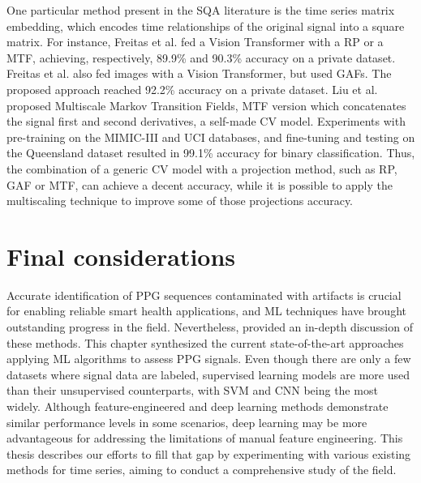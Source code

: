 

One particular method present in the \gls{SQA} literature is the time series matrix embedding, which encodes time relationships of the original signal into a square matrix. For instance, Freitas et al. \cite{imaging-4} fed a Vision Transformer with a \gls{RP} or a \gls{MTF}, achieving, respectively, 89.9\% and 90.3\% accuracy on a private dataset. Freitas et al. \cite{imaging-5} also fed images with a Vision Transformer, but used \glspl{GAF}. The proposed approach reached 92.2\% accuracy on a private dataset. Liu et al. \cite{imaging-6} proposed  Multiscale Markov Transition Fields, \gls{MTF} version which concatenates the signal first and second derivatives,  a self-made \gls{CV} model. Experiments with pre-training on the MIMIC-III and UCI databases, and fine-tuning and testing on the Queensland dataset resulted in 99.1\% accuracy for binary classification. Thus, the combination of a generic \gls{CV} model with a projection method, such as \gls{RP}, \gls{GAF} or \gls{MTF}, can achieve a decent accuracy, while it is possible to apply the multiscaling technique to improve some of those projections accuracy. 


\section{Final considerations}
\label{sec:considerations}

Accurate identification of \gls{PPG} sequences contaminated with artifacts is crucial for enabling reliable smart health applications, and \gls{ML} techniques have brought outstanding progress in the field. Nevertheless,  provided an in-depth discussion of these methods. This chapter synthesized the current state-of-the-art approaches applying \gls{ML} algorithms to assess \gls{PPG} signals. Even though there are only a few datasets where signal data are labeled, supervised learning models are more used than their unsupervised counterparts, with \gls{SVM} and \gls{CNN} being the most
widely. Although feature-engineered and deep learning methods demonstrate similar performance levels in some scenarios, deep learning may be more advantageous for addressing the limitations of manual feature engineering.  This thesis describes our efforts to fill that gap by experimenting with various existing methods for time series, aiming to conduct a comprehensive study of the field.
